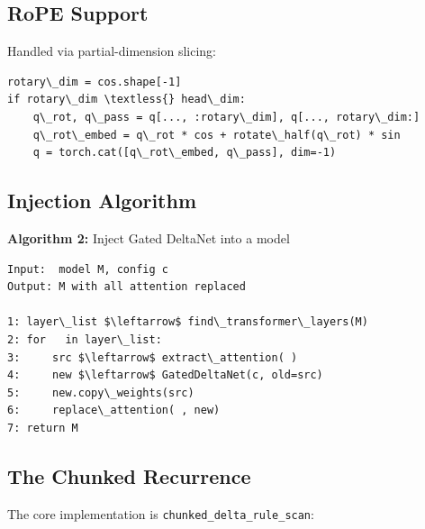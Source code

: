 \subsection{RoPE Support}

Handled via partial-dimension slicing:

\begin{lstlisting}
rotary\_dim = cos.shape[-1]
if rotary\_dim \textless{} head\_dim:
    q\_rot, q\_pass = q[..., :rotary\_dim], q[..., rotary\_dim:]
    q\_rot\_embed = q\_rot * cos + rotate\_half(q\_rot) * sin
    q = torch.cat([q\_rot\_embed, q\_pass], dim=-1)
\end{lstlisting}

\subsection{Injection Algorithm}

\textbf{Algorithm 2:} Inject Gated DeltaNet into a model
\begin{lstlisting}
Input:  model M, config c
Output: M with all attention replaced

1: layer\_list $\leftarrow$ find\_transformer\_layers(M)
2: for   in layer\_list:
3:     src $\leftarrow$ extract\_attention( )
4:     new $\leftarrow$ GatedDeltaNet(c, old=src)
5:     new.copy\_weights(src)
6:     replace\_attention( , new)
7: return M
\end{lstlisting}

\subsection{The Chunked Recurrence}

The core implementation is \texttt{chunked\_delta\_rule\_scan}:

